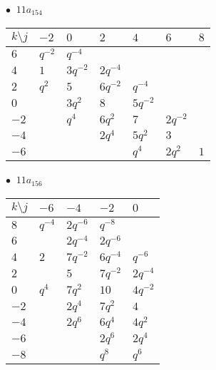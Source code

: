\begin{minipage}{\linewidth}
$\bullet\ $ $11a_{154}$ \vspace{0.5em} \\
\begin{tabular}{l|llllll}
$k \setminus j$ & $-2$ & $0$ & $2$ & $4$ & $6$ & $8$ \\
\hline
$6$ & $q^{-2}$ & $q^{-4}$ &  &  &  &  \\
$4$ & $1$ & $3q^{-2}$ & $2q^{-4}$ &  &  &  \\
$2$ & $q^{2}$ & $5$ & $6q^{-2}$ & $q^{-4}$ &  &  \\
$0$ &  & $3q^{2}$ & $8$ & $5q^{-2}$ &  &  \\
$-2$ &  & $q^{4}$ & $6q^{2}$ & $7$ & $2q^{-2}$ &  \\
$-4$ &  &  & $2q^{4}$ & $5q^{2}$ & $3$ &  \\
$-6$ &  &  &  & $q^{4}$ & $2q^{2}$ & $1$ \\
\end{tabular}
\vspace{2em}
\end{minipage}
%
\begin{minipage}{\linewidth}
$\bullet\ $ $11a_{156}$ \vspace{0.5em} \\
\begin{tabular}{l|llll}
$k \setminus j$ & $-6$ & $-4$ & $-2$ & $0$ \\
\hline
$8$ & $q^{-4}$ & $2q^{-6}$ & $q^{-8}$ &  \\
$6$ &  & $2q^{-4}$ & $2q^{-6}$ &  \\
$4$ & $2$ & $7q^{-2}$ & $6q^{-4}$ & $q^{-6}$ \\
$2$ &  & $5$ & $7q^{-2}$ & $2q^{-4}$ \\
$0$ & $q^{4}$ & $7q^{2}$ & $10$ & $4q^{-2}$ \\
$-2$ &  & $2q^{4}$ & $7q^{2}$ & $4$ \\
$-4$ &  & $2q^{6}$ & $6q^{4}$ & $4q^{2}$ \\
$-6$ &  &  & $2q^{6}$ & $2q^{4}$ \\
$-8$ &  &  & $q^{8}$ & $q^{6}$ \\
\end{tabular}
\vspace{2em}
\end{minipage}
%
